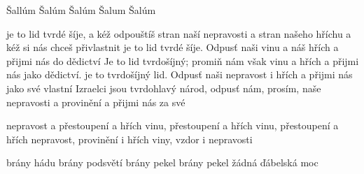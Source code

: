         {Šallúm}  %
        {Šalúm}  %
        {Šalúm}  %
        {Šalum}  %
        {Šalúm}  %

      {je to lid tvrdé šíje, a kéž odpouštíš stran naší nepravosti a stran našeho hříchu a kéž si nás chceš přivlastnit}
      {je to lid tvrdé šíje. Odpusť naši vinu a náš hřích a přijmi nás do dědictví}
      {Je to lid tvrdošíjný; promiň nám však vinu a hřích a přijmi nás jako dědictví.}
      {je to tvrdošíjný lid. Odpusť naši nepravost i hřích a přijmi nás jako své vlastní}
      {Izraelci jsou tvrdohlavý národ, odpusť nám, prosím, naše nepravosti a provinění a přijmi nás za své}


      {nepravost a přestoupení a hřích}
      {vinu, přestoupení a hřích}
      {vinu, přestoupení a hřích}
      {nepravost, provinění i hřích}
      {viny, vzdor i nepravosti}

      
      {brány hádu}
      {brány podsvětí}
      {brány pekel}
      {brány pekel}
      {žádná ďábelská moc}

      

